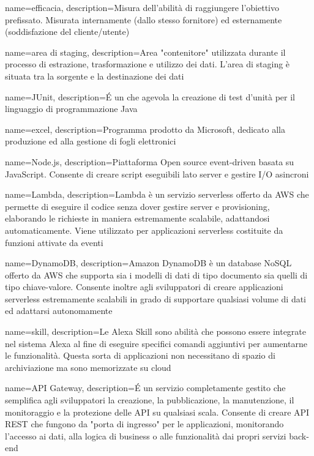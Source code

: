 {
	name=efficacia,
	description={Misura dell’abilità di raggiungere l’obiettivo prefissato. Misurata internamente (dallo stesso fornitore) ed esternamente (soddisfazione del cliente/utente)}
}

{
	name=area di staging,
	description={Area "contenitore" utilizzata durante il processo di estrazione, trasformazione e utilizzo dei dati. L'area di staging è situata tra la sorgente e la destinazione dei dati}
}

{
	name=JUnit,
	description={\'E un  che agevola la creazione di test d'unità per il linguaggio di programmazione Java}
}

{
	name=excel,
	description={Programma prodotto da Microsoft, dedicato alla produzione ed alla gestione di fogli elettronici}
}


{
  name=Node.js,
  description={Piattaforma Open source event-driven basata su JavaScript. Consente di creare script eseguibili lato server e gestire I/O asincroni}
}

{
  name=Lambda,
  description={Lambda è un servizio serverless offerto da AWS che permette di eseguire il codice senza dover gestire server e provisioning, elaborando le richieste in maniera estremamente scalabile, adattandosi automaticamente. Viene utilizzato per applicazioni serverless costituite da funzioni attivate da eventi}
}

{
  name=DynamoDB,
  description={Amazon DynamoDB è un database NoSQL offerto da AWS che supporta sia i modelli di dati di tipo documento sia quelli di tipo chiave-valore. Consente inoltre agli sviluppatori di creare applicazioni serverless estremamente scalabili in grado di supportare qualsiasi volume di dati ed adattarsi autonomamente}
}

{
  name=skill,
  description={Le Alexa Skill sono abilità che possono essere integrate nel sistema Alexa al fine di eseguire specifici comandi aggiuntivi per aumentarne le funzionalità. Questa sorta di applicazioni non necessitano di spazio di archiviazione ma sono memorizzate su cloud}
}

{
  name=API Gateway,
  description={\'E un servizio completamente gestito che semplifica agli sviluppatori la creazione, la pubblicazione, la manutenzione, il monitoraggio e la protezione delle API su qualsiasi scala. Consente di creare API REST che fungono da "porta di ingresso" per le applicazioni, monitorando l'accesso ai dati, alla logica di business o alle funzionalità dai propri servizi back-end}
}

